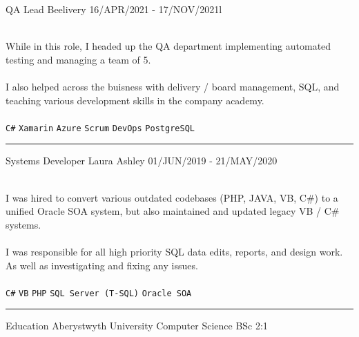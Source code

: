 \documentclass[12pt]{developercv}
\begin{document}
\begin{minipage}[t]{0.81\textwidth}
\begin{entrylist}
\entry
	{}
	{QA Lead \footnotesize\textmd{Beelivery}}
	{16/APR/2021 - 17/NOV/2021l}
	{
		{
\\
While in this role, I headed up the QA department implementing automated testing and managing a team of 5.
\\\\
 I also helped across the buisness with delivery / board management, SQL, and teaching various development skills in the company academy.
\\\\
		}
	\texttt{C\#}\slashsep
	\texttt{Xamarin}\slashsep
	\texttt{Azure}\slashsep
	\texttt{Scrum}\slashsep
	\texttt{DevOps}\slashsep
	\texttt{PostgreSQL}

	\vspace{\baselineskip}
	\hrule
	}


\entry
	{}
	{Systems Developer \footnotesize\textmd{Laura Ashley}}
	{01/JUN/2019 - 21/MAY/2020}
	{
		{
\\
I was hired to convert various outdated codebases (PHP, JAVA, VB, C\#) to a unified Oracle SOA system, but also maintained and updated legacy VB / C\# systems. 
\\\\
I was responsible for all high priority SQL data edits, reports, and design work. As well as investigating and fixing any issues.
\\\\
		}
		\texttt{C\#}\slashsep
		\texttt{VB}\slashsep
		\texttt{PHP}\slashsep
		\texttt{SQL Server (T-SQL)}\slashsep
		\texttt{Oracle SOA}

	\vspace{\baselineskip}
	\hrule
	}


\entry
	{}
	{Education}
	{Aberystwyth University}
	{
	Computer Science BSc \hfill 2:1
	}


\end{entrylist}



\end{minipage}
\end{document}
